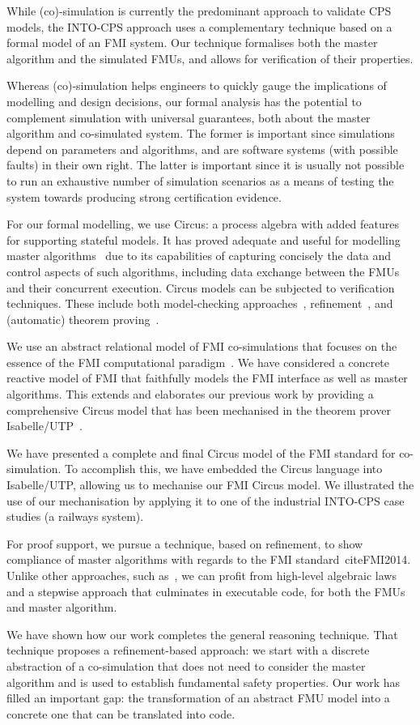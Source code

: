 While (co)-simulation is currently the predominant approach to validate CPS models, the INTO-CPS approach uses a complementary technique based on a formal model of an FMI system. Our technique formalises both the master algorithm and the simulated FMUs, and allows for verification of their properties.

Whereas (co)-simulation helps engineers to quickly gauge the implications of modelling and design decisions, our formal analysis has the potential to complement simulation with universal guarantees, both about the master algorithm and co-simulated system. The former is important since simulations depend on parameters and algorithms, and are software systems (with possible faults) in their own right. The latter is important since it is usually not possible to run an exhaustive number of simulation scenarios as a means of testing the system towards producing strong certification evidence.

For our formal modelling, we use Circus: a process algebra with added features for supporting stateful models. It has proved adequate and useful for modelling master algorithms~\cite{CavalcantiWA16} due to its capabilities of capturing concisely the data and control aspects of such algorithms, including data exchange between the FMUs and their concurrent execution. Circus models can be subjected to verification techniques. These include both model-checking approaches~\cite{GrumbergV2008}, refinement~\cite{CavalcantiSW2003}, and (automatic) theorem proving~\cite{OliveiraCW2009}.

We use an abstract relational model of FMI co-simulations that focuses on the essence of the FMI computational paradigm~\cite{ZCWO17}. We have considered a concrete reactive model of FMI that faithfully models the FMI interface as well as master algorithms. This extends and elaborates our previous work by providing a comprehensive Circus model that has been mechanised in the theorem prover Isabelle/UTP~\cite{FosterZW2016}.

We have presented a complete and final Circus model of the FMI standard for co-simulation. To accomplish this, we have embedded the Circus language into Isabelle/UTP, allowing us to mechanise our FMI Circus model.  We illustrated the use of our mechanisation by applying it to one of the industrial INTO-CPS case studies (a railways system).

For proof support, we pursue a technique, based on refinement, to show compliance of master algorithms with regards to the FMI standard~cite{FMI2014}. Unlike other approaches, such as~\cite{Broman2013}, we can profit from high-level algebraic laws and a stepwise approach that culminates in executable code, for both the FMUs and master algorithm.

We have shown how our work completes the general reasoning technique. That technique proposes a refinement-based approach: we start with a discrete abstraction of a co-simulation that does not need to consider the master algorithm and is used to establish fundamental safety properties. Our work has filled an important gap: the transformation of an abstract FMU model into a concrete one that can be translated into code.
